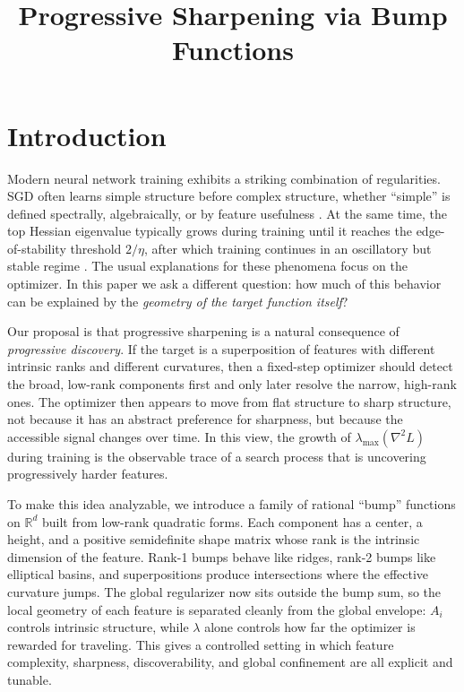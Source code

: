 \documentclass{article}
\title{Progressive Sharpening via Bump Functions}
\author{}
\date{}
\begin{document}
\maketitle

\section{Introduction}

Modern neural network training exhibits a striking combination of
regularities. SGD often learns simple structure before complex
structure, whether ``simple'' is defined spectrally, algebraically, or
by feature usefulness
\cite{shah2020simplicity,kalimeris2019sgd,rahaman2019spectral}. At the
same time, the top Hessian eigenvalue typically grows during training
until it reaches the edge-of-stability threshold $2/\eta$, after which
training continues in an oscillatory but stable regime
\cite{cohen2021gradient,arora2022understanding,damian2023selfstabilization}.
The usual explanations for these phenomena focus on the optimizer. In
this paper we ask a different question: how much of this behavior can be
explained by the \emph{geometry of the target function itself}?

Our proposal is that progressive sharpening is a natural consequence of
\emph{progressive discovery}. If the target is a superposition of
features with different intrinsic ranks and different curvatures, then a
fixed-step optimizer should detect the broad, low-rank components first
and only later resolve the narrow, high-rank ones. The optimizer then
appears to move from flat structure to sharp structure, not because it
has an abstract preference for sharpness, but because the accessible
signal changes over time. In this view, the growth of
$\lambda_{\max}(\nabla^2 L)$ during training is the observable trace of a
search process that is uncovering progressively harder features.

To make this idea analyzable, we introduce a family of rational ``bump''
functions on $\mathbb{R}^d$ built from low-rank quadratic forms. Each
component has a center, a height, and a positive semidefinite shape
matrix whose rank is the intrinsic dimension of the feature. Rank-1
bumps behave like ridges, rank-2 bumps like elliptical basins, and
superpositions produce intersections where the effective curvature jumps.
The global regularizer now sits outside the bump sum, so the local
geometry of each feature is separated cleanly from the global envelope:
$A_i$ controls intrinsic structure, while $\lambda$ alone controls how
far the optimizer is rewarded for traveling. This gives a controlled
setting in which feature complexity, sharpness, discoverability, and
global confinement are all explicit and tunable.
\end{document}
